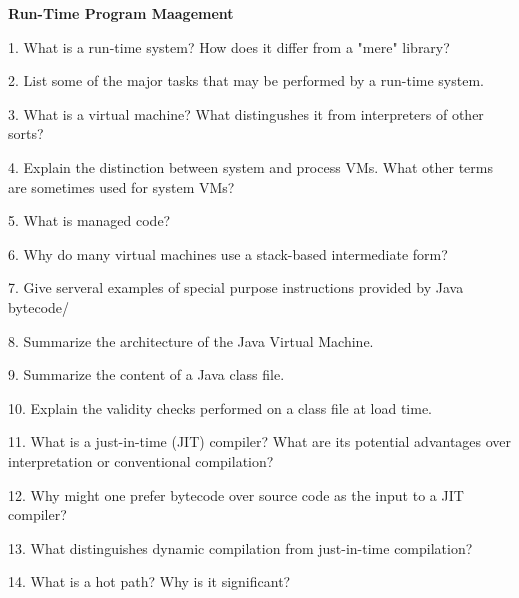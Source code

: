 \centerline{\bf Run-Time Program Maagement}

\vskip 1cm

1. What is a run-time system? How does it differ from a "mere" library?

\filbreak
\vskip 1cm

2. List some of the major tasks that may be performed by a run-time system.

\filbreak
\vskip 1cm

3. What is a virtual machine? What distingushes it from interpreters of other sorts?

\filbreak
\vskip 1cm

4. Explain the distinction between system and process VMs. What other terms are sometimes used for system VMs?

\filbreak
\vskip 1cm

5. What is managed code?

\filbreak
\vskip 1cm

6. Why do many virtual machines use a stack-based intermediate form?

\filbreak
\vskip 1cm

7. Give serveral examples of special purpose instructions provided by Java bytecode/

\filbreak
\vskip 1cm

8. Summarize the architecture of the Java Virtual Machine.

\filbreak
\vskip 1cm

9. Summarize the content of a Java class file.

\filbreak
\vskip 1cm

10. Explain the validity checks performed on a class file at load time.

\filbreak
\vskip 1cm

11. What is a just-in-time (JIT) compiler? What are its potential advantages over interpretation or conventional compilation?

\filbreak
\vskip 1cm

12. Why might one prefer bytecode over source code as the input to a JIT compiler?

\filbreak
\vskip 1cm

13. What distinguishes dynamic compilation from just-in-time compilation?

\filbreak
\vskip 1cm

14. What is a hot path? Why is it significant?

\filbreak
\vskip 1cm

